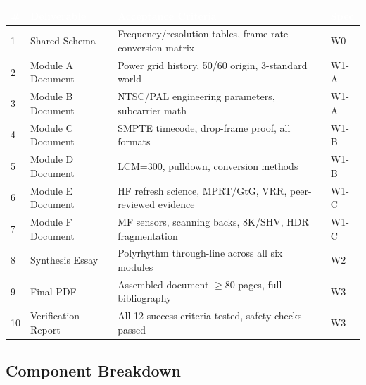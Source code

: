 \documentclass[11pt,letterpaper]{article}
\newcommand{\tableheader}[1]{\textbf{\sffamily\textcolor{white}{#1}}}
\begin{document}
\begin{center}
\begin{tabularx}{\textwidth}{C{0.5cm}L{3.5cm}XC{2.5cm}}
\toprule
{}
\tableheader{\#} & \tableheader{Deliverable} & \tableheader{Acceptance Criteria} & \tableheader{Spec} \\
 & Shared Schema & Frequency/resolution tables, frame-rate conversion matrix & W0 \\
2 & Module A Document & Power grid history, 50/60 origin, 3-standard world & W1-A \\
3 & Module B Document & NTSC/PAL engineering parameters, subcarrier math & W1-A \\
4 & Module C Document & SMPTE timecode, drop-frame proof, all formats & W1-B \\
5 & Module D Document & LCM=300, pulldown, conversion methods & W1-B \\
6 & Module E Document & HF refresh science, MPRT/GtG, VRR, peer-reviewed evidence & W1-C \\
7 & Module F Document & MF sensors, scanning backs, 8K/SHV, HDR fragmentation & W1-C \\
8 & Synthesis Essay & Polyrhythm through-line across all six modules & W2 \\
9 & Final PDF & Assembled document $\geq$80 pages, full bibliography & W3 \\
10 & Verification Report & All 12 success criteria tested, safety checks passed & W3 \\
\bottomrule
\end{tabularx}
\end{center}

\subsection{Component Breakdown}
\end{document}
